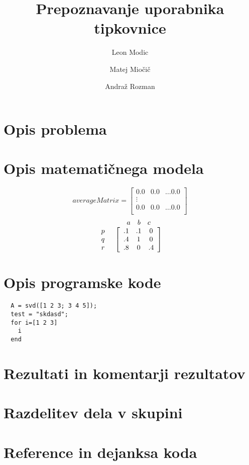 \documentclass[12pt]{article}
\begin{document}
\title{\textbf{Prepoznavanje uporabnika tipkovnice}}
\author{
  Leon Modic\\
  \and
  Matej Miočič\\
  \and
  Andraž Rozman\\
}
\maketitle

\section{Opis problema}

\section{Opis matematičnega modela}
\[
  averageMatrix=
  \begin{bmatrix}
    0.0 & 0.0 & \dots 0.0\\
    \vdots \\
    0.0 & 0.0 & \dots 0.0\\
  \end{bmatrix}
\]
\[
  \begin{array}{c c} &
    \begin{array}{c c c} a & b &c \\
    \end{array}\\
    \begin{array}{c c c}
      p \\
      q \\
      r
    \end{array}
    &
    \left[
    \begin{array}{c c c}
    .1 & .1 & 0 \\
    .4 & 1 & 0 \\
    .8 & 0 & .4
    \end{array}
    \right]
  \end{array}
\]
\section{Opis programske kode}
\begin{lstlisting}
  A = svd([1 2 3; 3 4 5]);
  test = "skdasd";
  for i=[1 2 3]
    i
  end
\end{lstlisting}

\section{Rezultati in komentarji rezultatov}

\section{Razdelitev dela v skupini}

\section{Reference in dejanksa koda}
\end{document}
